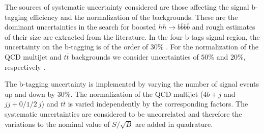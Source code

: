 The sources of systematic uncertainty considered are those affecting the signal b-tagging efficiency and the normalization of the backgrounds. These are the dominant uncertainties in the search for boosted $hh\rightarrow b\overline{b}b\overline{b}$ \cite{hh2bbbbATLAS1} and rough estimates of their size are extracted from the literature. In the four b-tags signal region, the uncertainty on the b-tagging is of the order of $30\%$ \cite{hh2bbbbATLAS1}. For the normalization of the QCD multijet and $t\overline{t}$ backgrounds we consider uncertainties of $50\%$ and $20\%$, respectively \cite{FCCphysClement}.

The b-tagging uncertainty is implemented by varying the number of signal events up and down by $30\%$. The normalization of the QCD multijet ($4b+j$ and $jj+0/1/2~j$) and $t\overline{t}$ is varied independently by the corresponding factors. The systematic uncertainties are considered to be uncorrelated and therefore the variations to the nominal value of $S/\sqrt{B}$ are added in quadrature.


